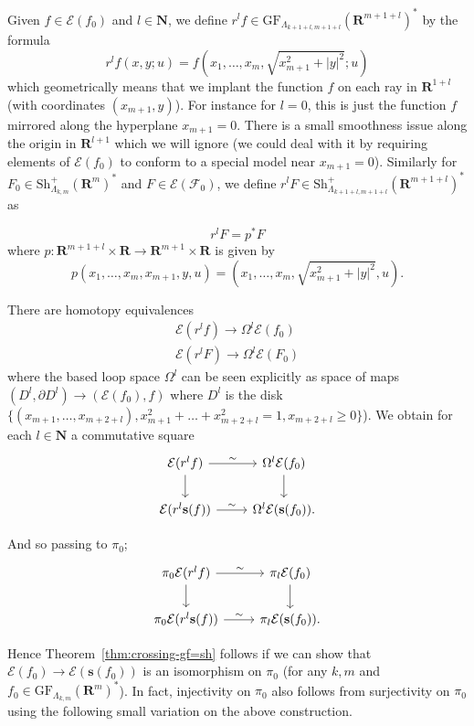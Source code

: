 \documentclass[12pt,a4paper]{article}
\numberwithin{equation}{section}
\theoremstyle{definition}
\theoremstyle{remark}
\newcommand{\E}{\mathcal{E}}
\newcommand{\R}{\mathbf{R}}
\newcommand{\F}{\mathcal{F}}
\newcommand{\N}{\mathbf{N}}
\newcommand{\del}{\partial}
\newcommand{\s}{\mathbf{s}}
\newcommand{\Sh}{\mathrm{Sh}}
\newcommand{\GF}{\mathrm{GF}}
\begin{document}
Given $f\in \E(f_0)$ and $l\in \N$, we define
$r^lf \in \GF_{\Lambda_{k+1+l,m+1+l}}(\R^{m+1+l})^*$ by the formula
\[r^l f(x,y;u)=f(x_1,\dots,x_m,\sqrt{x_{m+1}^2+|y|^2};u)\]
which geometrically means that we implant the function $f$ on each ray in $\R^{1+l}$ (with coordinates $(x_{m+1},y)$). For instance for $l=0$,
this is just the function $f$ mirrored along the hyperplane $x_{m+1}=0$.
There is a small smoothness issue along the origin in $\R^{l+1}$ which we will ignore (we could deal with it by requiring elements of $\E(f_0)$
to conform to a special model near $x_{m+1}=0$).
Similarly for $F_0\in \Sh^+_{\Lambda_{k,m}}(\R^m)^*$ and $F\in \E(\F_0)$, we define $r^l F \in \Sh^+_{\Lambda_{k+1+l,m+1+l}}(\R^{m+1+l})^*$ as

\begin{equation}
r^l F=p^* F
\end{equation}
where $p: \R^{m+1+l}\times \R\to \R^{m+1}\times \R$ is given by
\[p(x_1,\dots,x_m,x_{m+1},y,u)=(x_1,\dots,x_m,\sqrt{x_{m+1}^2+|y|^2},u).\]

There are homotopy equivalences
\begin{align}
\E(r^l f)\to \Omega^l \E(f_0)\\
\E(r^l F)\to \Omega^l \E(F_0)
\end{align}
where the based loop space $\Omega^l$ can be seen explicitly as space of maps $(D^l,\del D^l)\to (\E(f_0),f)$
where $D^l$ is the disk $\{(x_{m+1},\dots,x_{m+2+l}), x_{m+1}^2+\dots+x_{m+2+l}^2=1, x_{m+2+l}\geq 0\}$).
We obtain for each $l\in \N$ a commutative square
\begin{equation}
\begin{tikzcd}
\E(r^l f)\arrow[r,"\sim"] \arrow[d] & \Omega^l \E(f_0) \arrow[d] \\
\E(r^l \s(f))\arrow[r,"\sim"]&\Omega^l \E(\s(f_0)).
\end{tikzcd}
\end{equation}

And so passing to $\pi_0$;
\begin{equation}
\begin{tikzcd}
\pi_0\E(r^l f)\arrow[r,"\sim"] \arrow[d] & \pi_l \E(f_0) \arrow[d] \\
\pi_0\E(r^l \s(f))\arrow[r,"\sim"]&\pi_l \E(\s(f_0)).
\end{tikzcd}
\end{equation}

Hence Theorem~\ref{thm:crossing-gf=sh} follows if we can show that $\E(f_0)\to \E(\s(f_0))$ is an isomorphism
on $\pi_0$ (for any $k,m$ and $f_0\in  \GF_{\Lambda_{k,m}}(\R^m)^*$). In fact, injectivity on $\pi_0$ also follows
from surjectivity on $\pi_0$ using the following small variation
on the above construction.
\end{document}
